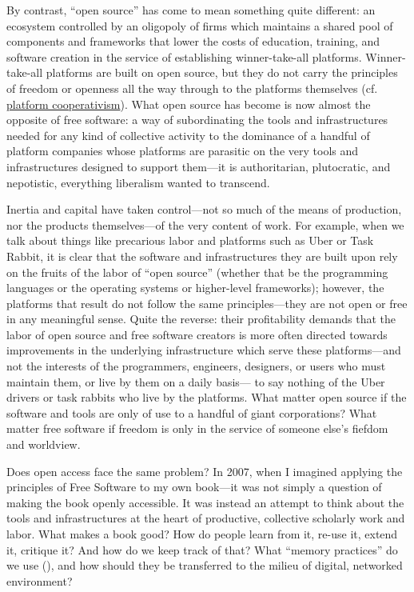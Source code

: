 \documentclass[11pt]{article}
\begin{document}
By contrast, ``open source'' has come to mean something quite different: an ecosystem controlled by an oligopoly of firms which maintains a shared pool of components and frameworks that lower the costs of education, training, and software creation in the service of establishing winner-take-all platforms.  Winner-take-all platforms are built on open source, but they do not carry the principles of freedom or openness all the way through to the platforms themselves (cf. \href{https://platform.coop/directory}{platform cooperativism}).  What open source has become is now almost the opposite of free software:  a way of subordinating the tools and infrastructures needed for any kind of collective activity to the dominance of a handful of platform companies whose platforms are parasitic on the very tools and infrastructures designed to support them---it is authoritarian, plutocratic, and nepotistic, everything liberalism wanted to transcend.  

Inertia and capital have taken control---not so much of the means of production, nor the products themselves---of the very content of work.   For example, when we talk about things like precarious labor and platforms such as Uber or Task Rabbit, it is clear that the software and infrastructures they are built upon rely on the fruits of the labor of ``open source'' (whether that be the programming languages or the operating systems or higher-level frameworks); however, the platforms that result do not follow the same principles---they are not open or free in any meaningful sense.  Quite the reverse: their profitability demands that the labor of open source and free software creators is more often directed towards improvements in the underlying infrastructure which serve these platforms---and not the interests of the programmers, engineers, designers, or users who must maintain them, or live by them on a daily basis--- to say nothing of the Uber drivers or task rabbits who live by the platforms.  What  matter open source if the software and tools are only of use to a handful of giant corporations?  What matter free software if freedom is only in the service of someone else's fiefdom and worldview. 

Does open access face the same problem?  In 2007, when I imagined applying the principles of Free Software to my own book---it was not simply a question of making the book openly accessible.  It was instead an attempt to think about the tools and infrastructures at the heart of productive, collective scholarly work and labor.  What makes a book good? How do people learn from it, re-use it, extend it, critique it?  And how do we keep track of that? What ``memory practices'' do we use (\cite{bowker2005memorpracscien}), and how should they be transferred to the milieu of digital, networked environment?
\end{document}
